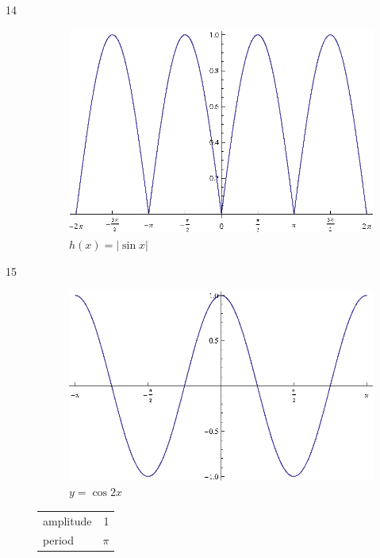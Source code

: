 \documentclass{exam}
\begin{document}
\begin{description}
      \item[14]
        \begin{figure}[H]
          \centering
          \includegraphics[scale=0.9]{exercise14.eps}
          \caption{$h(x) = | \sin x |$}
        \end{figure}

      \item[15]
        \begin{figure}[H]
          \centering
          \includegraphics[scale=0.8]{exercise15.eps}
          \caption{$y = \cos 2x$}
        \end{figure}

        \begin{tabular}[H]{lr}
          \toprule
          amplitude & 1 \\
          period & $\pi$ \\
          \bottomrule
        \end{tabular}


\end{description}
\end{document}
